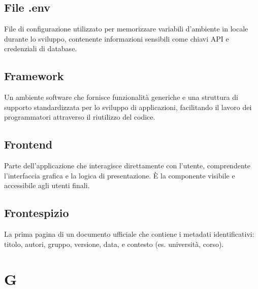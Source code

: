 \documentclass[a4paper, 11pt, oneside]{scrartcl} %
\begin{document}
\vspace{0.5cm}

\subsection*{File .env}


File di configurazione utilizzato per memorizzare variabili d'ambiente in locale durante lo sviluppo, contenente informazioni sensibili come chiavi API e credenziali di database.

\vspace{0.5cm}

\subsection*{Framework}
Un ambiente software che fornisce funzionalità generiche e una struttura di supporto standardizzata per lo sviluppo di applicazioni, facilitando il lavoro dei programmatori attraverso il riutilizzo del codice.
\vspace{0.5cm}

\subsection*{Frontend}


Parte dell'applicazione che interagisce direttamente con l'utente, comprendente l'interfaccia grafica e la logica di presentazione. È la componente visibile e accessibile agli utenti finali.

\vspace{0.5cm}

\subsection*{Frontespizio}


La prima pagina di un documento ufficiale che contiene i metadati identificativi: titolo, autori, gruppo, versione, data, e contesto (es. università, corso).

\vspace{0.5cm}


\section*{G}
\end{document}
